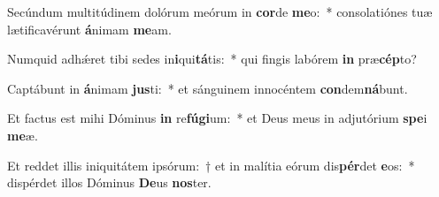 \item Secúndum multitúdinem dolórum meórum in \textbf{cor}de \textbf{me}o:~* consolatiónes tuæ lætificavérunt \textbf{á}nimam \textbf{me}am.
\item Numquid adhǽret tibi sedes in\textbf{i}qui\textbf{tá}tis:~* qui fingis labórem \textbf{in} præ\textbf{cép}to?
\item Captábunt in \textbf{á}nimam \textbf{jus}ti:~* et sánguinem innocéntem \textbf{con}dem\textbf{ná}bunt.
\item Et factus est mihi Dóminus \textbf{in} re\textbf{fú}\textbf{gi}um:~* et Deus meus in adjutórium \textbf{spe}i \textbf{me}æ.
\item Et reddet illis iniquitátem ipsórum:~† et in malítia eórum dis\textbf{pér}det \textbf{e}os:~* dispérdet illos Dóminus \textbf{De}us \textbf{nos}ter.
